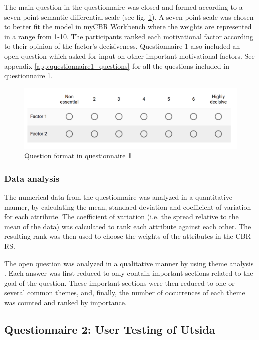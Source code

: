 The main question in the questionnaire was closed and formed according to a seven-point semantic differential scale (see fig. \ref{fig:semantic_scale}). A seven-point scale was chosen to better fit the model in myCBR Workbench where the weights are represented in a range from 1-10. The participants ranked each motivational factor according to their opinion of the factor's decisiveness. Questionnaire 1 also included an open question which asked for input on other important motivational factors. See appendix \ref{app:questionnaire1_questions} for all the questions included in questionnaire 1. 

\begin{figure}[h!]
    \centering
    \includegraphics[width=1\textwidth]{fig/question1.png}
    \caption{Question format in questionnaire 1}
    \label{fig:semantic_scale}
\end{figure}

\subsubsection{Data analysis}

The numerical data from the questionnaire was analyzed in a quantitative manner, by calculating the mean, standard deviation and coefficient of variation for each attribute. The coefficient of variation (i.e. the spread relative to the mean of the data) was calculated to rank each attribute against each other. The resulting rank was then used to choose the weights of the attributes in the CBR-RS.

The open question was analyzed in a qualitative manner by using theme analysis \cite{oates2005researching}. Each answer was first reduced to only contain important sections related to the goal of the question. These important sections were then reduced to one or several common themes, and, finally, the number of occurrences of each theme was counted and ranked by importance.

\subsection{Questionnaire 2: User Testing of Utsida}\label{sec:questionnaire_2}

